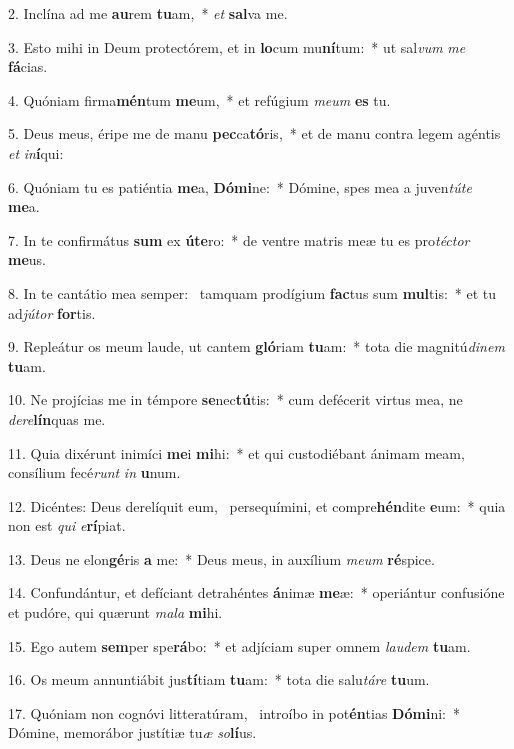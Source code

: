 2. Inclína ad me \textbf{au}rem \textbf{tu}am,~*  \textit{et} \textbf{sal}va me.\

3. Esto mihi in Deum protectórem, et in \textbf{lo}cum mu\textbf{ní}tum:~*  ut sal\textit{vum} \textit{me} \textbf{fá}cias.\

4. Quóniam firma\textbf{mén}tum \textbf{me}um,~*  et refúgium \textit{me}\textit{um} \textbf{es} tu.\

5. Deus meus, éripe me de manu \textbf{pec}ca\textbf{tó}ris,~*  et de manu contra legem agéntis \textit{et} \textit{in}\textbf{í}qui:\

6. Quóniam tu es patiéntia \textbf{me}a, \textbf{Dó}\textbf{mi}ne:~*  Dómine, spes mea a juven\textit{tú}\textit{te} \textbf{me}a.\

7. In te confirmátus \textbf{sum} ex \textbf{ú}\textbf{te}ro:~*  de ventre matris meæ tu es pro\textit{téc}\textit{tor} \textbf{me}us.\

8. In te cantátio mea semper: \dag\  tamquam prodígium \textbf{fac}tus sum \textbf{mul}tis:~*  et tu ad\textit{jú}\textit{tor} \textbf{for}tis.\

9. Repleátur os meum laude, ut cantem \textbf{gló}riam \textbf{tu}am:~*  tota die magnitú\textit{di}\textit{nem} \textbf{tu}am.\

10. Ne projícias me in témpore \textbf{se}nec\textbf{tú}tis:~*  cum defécerit virtus mea, ne \textit{de}\textit{re}\textbf{lín}quas me.\

11. Quia dixérunt inimíci \textbf{me}i \textbf{mi}hi:~*  et qui custodiébant ánimam meam, consílium fecé\textit{runt} \textit{in} \textbf{u}num.\

12. Dicéntes: Deus derelíquit eum, \dag\  persequímini, et compre\textbf{hén}dite \textbf{e}um:~*  quia non est \textit{qui} \textit{e}\textbf{rí}piat.\

13. Deus ne elon\textbf{gé}ris \textbf{a} me:~*  Deus meus, in auxílium \textit{me}\textit{um} \textbf{ré}spice.\

14. Confundántur, et defíciant detrahéntes \textbf{á}nimæ \textbf{me}æ:~*  operiántur confusióne et pudóre, qui quærunt \textit{ma}\textit{la} \textbf{mi}hi.\

15. Ego autem \textbf{sem}per spe\textbf{rá}bo:~*  et adjíciam super omnem \textit{lau}\textit{dem} \textbf{tu}am.\

16. Os meum annuntiábit jus\textbf{tí}tiam \textbf{tu}am:~*  tota die salu\textit{tá}\textit{re} \textbf{tu}um.\

17. Quóniam non cognóvi litteratúram, \dag\  introíbo in pot\textbf{én}tias \textbf{Dó}\textbf{mi}ni:~*  Dómine, memorábor justítiæ tu\textit{æ} \textit{so}\textbf{lí}us.\

